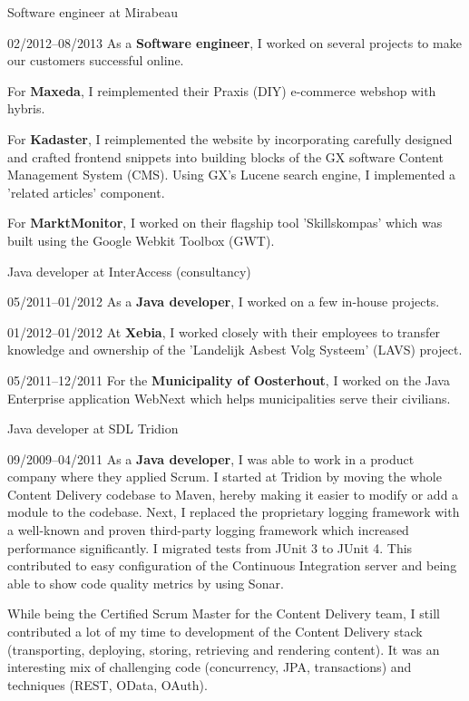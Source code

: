 \documentclass[11pt,a4paper]{article}
\begin{document}
\begin{cv}{}
	\begin{cvlist}{Software engineer at Mirabeau}
		\item[02/2012--08/2013] As a \textbf{Software engineer}, I worked on
		several projects to make our customers successful online.

		For \textbf{Maxeda}, I reimplemented their Praxis (DIY) e-commerce webshop
		with hybris.

		For \textbf{Kadaster}, I reimplemented the website by incorporating
		carefully designed and crafted frontend snippets into building blocks of
		the GX software Content Management System (CMS). Using GX's Lucene search
		engine, I implemented a 'related articles' component.

		For \textbf{MarktMonitor}, I worked on their flagship tool 'Skillskompas'
		which was built using the Google Webkit Toolbox (GWT).
	\end{cvlist}

	\begin{cvlist}{Java developer at InterAccess (consultancy)}
		\item[05/2011--01/2012] As a \textbf{Java developer}, I worked on a few
		in-house projects.
		\item[\color{gray}01/2012--01/2012] At \textbf{Xebia}, I worked closely
		with their employees to transfer knowledge and ownership of the 'Landelijk
		Asbest Volg Systeem' (LAVS) project.
		\item[\color{gray}05/2011--12/2011] For the \textbf{Municipality of
		Oosterhout}, I worked on the Java Enterprise application WebNext which
		helps municipalities serve their civilians.
	\end{cvlist}

	\begin{cvlist}{Java developer at SDL Tridion}
		\item[09/2009--04/2011] As a \textbf{Java developer}, I was able to work in
		a product company where they applied Scrum. I started at Tridion by moving
		the whole Content Delivery codebase to Maven, hereby making it easier to
		modify or add a module to the codebase. Next, I replaced the proprietary
		logging framework with a well-known and proven third-party logging
		framework which increased performance significantly. I migrated tests from
		JUnit 3 to JUnit 4. This contributed to easy configuration of the
		Continuous Integration server and being able to show code quality metrics
		by using Sonar.

		While being the Certified Scrum Master for the Content Delivery team, I
		still contributed a lot of my time to development of the Content Delivery
		stack (transporting, deploying, storing, retrieving and rendering content).
		It was an interesting mix of challenging code (concurrency, JPA,
		transactions) and techniques (REST, OData, OAuth).
	\end{cvlist}


\end{cv}
\end{document}
